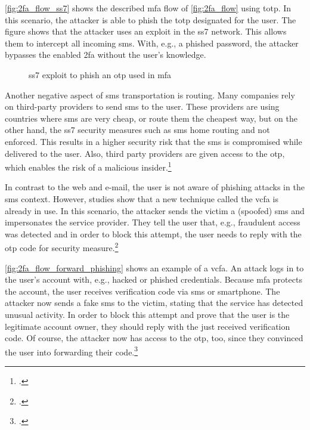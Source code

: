 \autoref{fig:2fa_flow_ss7} shows the described \gls{mfa} flow of \autoref{fig:2fa_flow} using \gls{totp}. In this scenario, the attacker is able to phish the \gls{totp} designated for the user. The figure shows that the attacker uses an exploit in the \gls{ss7} network. This allows them to intercept all incoming \gls{sms}. With, e.g., a phished password, the attacker bypasses the enabled \gls{2fa} without the user's knowledge.

\begin{figure}[hbt]
	\centering
	
	\caption[\gls{ss7} exploit to phish an \gls{otp} used in \gls{mfa}]{\gls{ss7} exploit to phish an \gls{otp} used in \gls{mfa}\footnotemark}
	\label{fig:2fa_flow_ss7}
\end{figure}

Another negative aspect of \gls{sms} transportation is routing. Many companies rely on third-party providers to send \gls{sms} to the user. These providers are using countries where \gls{sms} are very cheap, or route them the cheapest way, but on the other hand, the \gls{ss7} security measures such as \gls{sms} home routing and not enforced. This results in a higher security risk that the \gls{sms} is compromised while delivered to the user. Also, third party providers are given access to the \gls{otp}, which enables the risk of a malicious insider.\footcites[See][153]{10.1007/978-3-642-39235-1_9}[See][4, 9, 12]{Certic2018}

In contrast to the web and e-mail, the user is not aware of phishing attacks in the \gls{sms} context. However, studies show that a new technique called the \gls{vcfa} is already in use. In this scenario, the attacker sends the victim a (spoofed) \gls{sms} and impersonates the service provider. They tell the user that, e.g., fraudulent access was detected and in order to block this attempt, the user needs to reply with the \gls{otp} code for security measure.\footcites[See][6--7]{JAKOBSSON20186}[See][4--5]{SIADATI201714}

\newpage

\autoref{fig:2fa_flow_forward_phishing} shows an example of a \gls{vcfa}. An attack logs in to the user's account with, e.g., hacked or phished credentials. Because \gls{mfa} protects the account, the user receives verification code via \gls{sms} or smartphone. The attacker now sends a fake \gls{sms} to the victim, stating that the service has detected unusual activity. In order to block this attempt and prove that the user is the legitimate account owner, they should reply with the just received verification code. Of course, the attacker now has access to the \gls{otp}, too, since they convinced the user into forwarding their code.\footcites[See][66]{10.1007/978-3-319-29938-9_5}

